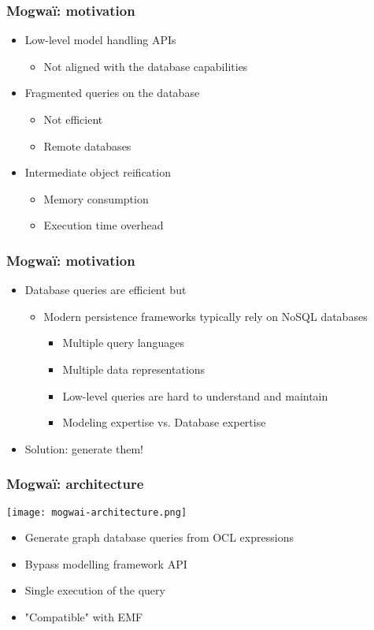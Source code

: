 \begin{frame}[c]\frametitle{Mogwa\"i: motivation}
	\begin{itemize}
	\item Low-level model handling APIs
	\begin{itemize}
	\item Not aligned with the database capabilities
	\end{itemize}
	\item Fragmented queries on the database
	\begin{itemize}
	\item Not efficient
	\item Remote databases
	\end{itemize}
	\item Intermediate object reification
	\begin{itemize}
	\item Memory consumption
	\item Execution time overhead
	\end{itemize}	
	\end{itemize}
\end{frame}

\begin{frame}[c]\frametitle{Mogwa\"i: motivation}
\begin{itemize}
	\item Database queries are efficient but
	\begin{itemize}
		\item Modern persistence frameworks typically rely on NoSQL databases
		\begin{itemize}
		\item Multiple query languages
		\item Multiple data representations
		\item Low-level queries are hard to understand and maintain
		\item Modeling expertise vs. Database expertise
		\end{itemize}
	\end{itemize}
	\item Solution: generate them!
	\end{itemize}
\end{frame}

\begin{frame}[t]\frametitle{Mogwa\"i: architecture~\cite{DBLP:conf/rcis/DanielSC16}}
  \begin{center}
    \texttt{[image: mogwai-architecture.png]}
  \end{center}
	\begin{itemize}
	\item Generate graph database queries from OCL expressions
	\item Bypass modelling framework API
	\item Single execution of the query
	\item "Compatible" with EMF
	\end{itemize}
\end{frame}

